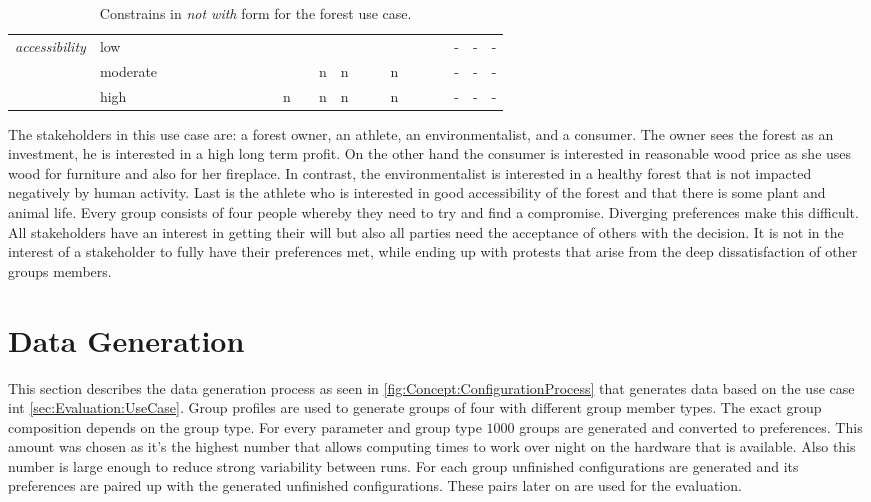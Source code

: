 \begin{table}
\begin{center}
\begin{tabularx}{\columnwidth}{cl|X|X|X|X|X|X|X|X|X|X|X|X|X|X|X|X|X|X|X|X|X|}
            \multirow{3}{*}{\textit{accessibility}} & low       &   &   &   &   &   &   &   &   &   &   &   &   &   &   &   &   &   &   & - & - & - \\ \cline{2-23}
                                                    & moderate  &   &   &   &   &   &   &   &   &   &   & n & n &   &   & n &   &   &   & - & - & - \\ \cline{2-23}
                                                    & high      &   &   &   &   &   &   &   &   & n &   & n & n &   &   & n &   &   &   & - & - & - \\ \hline
        
        \end{tabularx}
        \caption{Constrains in \emph{not with} form for the forest use case.}
        \label{tab:Evaluation:UseCase}
    \end{center}
\end{table}

The stakeholders in this use case are: a forest owner, an athlete, an environmentalist, and a consumer. The owner sees the forest as an investment, he is interested in a high long term profit. On the other hand the consumer is interested in reasonable wood price as she uses wood for furniture and also for her fireplace. In contrast, the environmentalist is interested in a healthy forest that is not impacted negatively by human activity. Last is the athlete who is interested in good accessibility of the forest and that there is some plant and animal life.
Every group consists of four people whereby they need to try and find a compromise. Diverging preferences make this difficult. All stakeholders have an interest in getting their will but also all parties need the acceptance of others with the decision. It is not in the interest of a stakeholder to fully have their preferences met, while ending up with protests that arise from the deep dissatisfaction of other groups members.

\section{Data Generation}
\label{sec:Evaluation:GeneratingGroups}

This section describes the data generation process as seen in \autoref{fig:Concept:ConfigurationProcess} that generates data based on the use case int  \autoref{sec:Evaluation:UseCase}. Group profiles are used to generate groups of four with different group member types. The exact group composition depends on the group type. For every parameter and group type $1000$ groups are generated and converted to preferences. This amount was chosen as it's the highest number that allows computing times to work over night on the hardware that is available. Also this number is large enough to reduce strong variability between runs. For each group unfinished configurations are generated and its preferences are paired up with the generated unfinished configurations. These pairs later on are used for the evaluation. 

